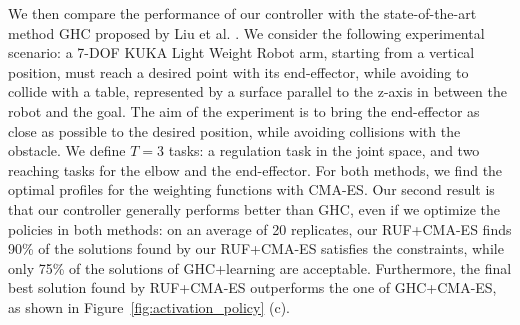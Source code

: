 \documentclass[final,5p,twocolumn]{elsarticle}
\begin{document}
We then compare the performance of our controller with the state-of-the-art
method GHC proposed by Liu et al. \cite{liuGHC2015}. We consider the
following experimental scenario: a 7-DOF KUKA Light Weight Robot arm, starting
from a vertical position, must reach a desired point with its end-effector,
while avoiding to collide with a table, represented by a surface parallel to the
z-axis in between the robot and the goal. The aim of the experiment is to bring
the end-effector as close as possible to the desired position, while avoiding
collisions with the obstacle. We define  $T=3$ tasks: a regulation task in the
joint space, and two reaching tasks for the elbow and the end-effector. For both
methods, we find the optimal profiles for the weighting functions with CMA-ES.
Our second result is that our controller generally performs better than GHC,
even if we optimize the policies in both methods: on an average of 20
replicates, our RUF+CMA-ES finds 90\% of the solutions found by our RUF+CMA-ES
satisfies the constraints, while only 75\% of the solutions of GHC+learning are
acceptable. Furthermore, the final best solution found by RUF+CMA-ES outperforms
the one of GHC+CMA-ES, as shown in Figure~\ref{fig:activation_policy} (c).
\end{document}
